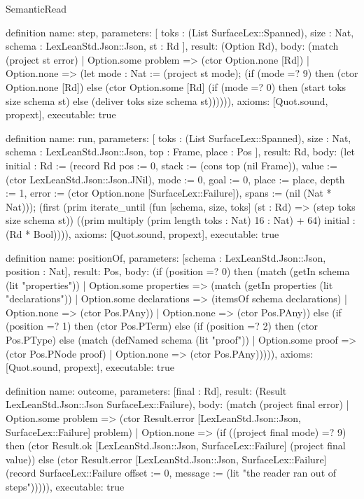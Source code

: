 \begin{lexlean}{SemanticRead}
\begin{semanticmodule}
definition{
  name: step,
  parameters: [
    toks : (List SurfaceLex::Spanned),
    size : Nat,
    schema : LexLeanStd.Json::Json,
    st : Rd
  ],
  result: (Option Rd),
  body: (match (project st error)
    | Option.some problem => (ctor Option.none [Rd])
    | Option.none => (let mode : Nat := (project st mode); (if (mode =? 9) then (ctor Option.none [Rd]) else (ctor Option.some [Rd] (if (mode =? 0) then (start toks size schema st) else (deliver toks size schema st)))))),
  axioms: [Quot.sound, propext],
  executable: true
}

definition{
  name: run,
  parameters: [
    toks : (List SurfaceLex::Spanned),
    size : Nat,
    schema : LexLeanStd.Json::Json,
    top : Frame,
    place : Pos
  ],
  result: Rd,
  body: (let initial : Rd := (record Rd {pos := 0, stack := (cons top (nil Frame)), value := (ctor LexLeanStd.Json::Json.JNil), mode := 0, goal := 0, place := place, depth := 1, error := (ctor Option.none [SurfaceLex::Failure]), spans := (nil (Nat * Nat))}); (first (prim iterate_until (fun [schema, size, toks] (st : Rd) => (step toks size schema st)) ((prim multiply (prim length toks : Nat) 16 : Nat) + 64) initial : (Rd * Bool)))),
  axioms: [Quot.sound, propext],
  executable: true
}

definition{
  name: positionOf,
  parameters: [schema : LexLeanStd.Json::Json, position : Nat],
  result: Pos,
  body: (if (position =? 0) then (match (getIn schema (lit "properties"))
    | Option.some properties => (match (getIn properties (lit "declarations"))
      | Option.some declarations => (itemsOf schema declarations)
      | Option.none => (ctor Pos.PAny))
    | Option.none => (ctor Pos.PAny)) else (if (position =? 1) then (ctor Pos.PTerm) else (if (position =? 2) then (ctor Pos.PType) else (match (defNamed schema (lit "proof"))
    | Option.some proof => (ctor Pos.PNode proof)
    | Option.none => (ctor Pos.PAny))))),
  axioms: [Quot.sound, propext],
  executable: true
}

definition{
  name: outcome,
  parameters: [final : Rd],
  result: (Result LexLeanStd.Json::Json SurfaceLex::Failure),
  body: (match (project final error)
    | Option.some problem => (ctor Result.error [LexLeanStd.Json::Json, SurfaceLex::Failure] problem)
    | Option.none => (if ((project final mode) =? 9) then (ctor Result.ok [LexLeanStd.Json::Json, SurfaceLex::Failure] (project final value)) else (ctor Result.error [LexLeanStd.Json::Json, SurfaceLex::Failure] (record SurfaceLex::Failure {offset := 0, message := (lit "the reader ran out of steps")})))),
  executable: true
}


\end{semanticmodule}
\end{lexlean}

